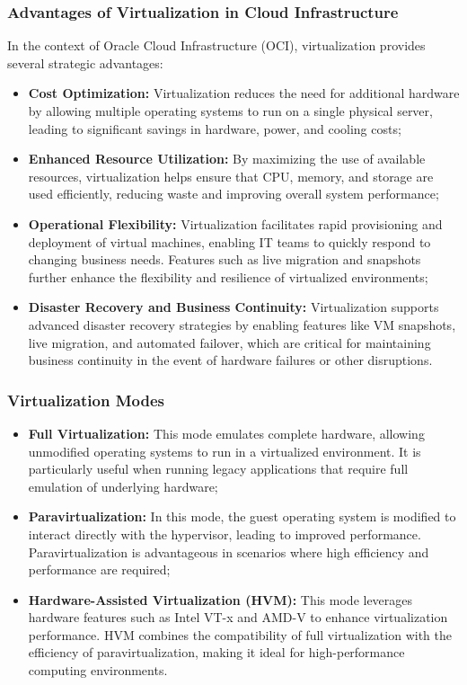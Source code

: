 \subsubsection[Advantages of Virtualization in Cloud Infrastructure]{Advantages of Virtualization in Cloud Infrastructure}
In the context of Oracle Cloud Infrastructure (OCI), virtualization provides several strategic advantages:\mynewline
\begin{itemize}
    \item \textbf{Cost Optimization:} Virtualization reduces the need for additional hardware by allowing multiple operating systems to run on a single physical server, leading to significant savings in hardware, power, and cooling costs;
    \item \textbf{Enhanced Resource Utilization:} By maximizing the use of available resources, virtualization helps ensure that CPU, memory, and storage are used efficiently, reducing waste and improving overall system performance;
    \item \textbf{Operational Flexibility:} Virtualization facilitates rapid provisioning and deployment of virtual machines, enabling IT teams to quickly respond to changing business needs. Features such as live migration and snapshots further enhance the flexibility and resilience of virtualized environments;
    \item \textbf{Disaster Recovery and Business Continuity:} Virtualization supports advanced disaster recovery strategies by enabling features like VM snapshots, live migration, and automated failover, which are critical for maintaining business continuity in the event of hardware failures or other disruptions.
\end{itemize}

\subsubsection[Virtualization Modes]{Virtualization Modes}
\begin{itemize}
    \item \textbf{Full Virtualization:} This mode emulates complete hardware, allowing unmodified operating systems to run in a virtualized environment. It is particularly useful when running legacy applications that require full emulation of underlying hardware;
    \item \textbf{Paravirtualization:} In this mode, the guest operating system is modified to interact directly with the hypervisor, leading to improved performance. Paravirtualization is advantageous in scenarios where high efficiency and performance are required;
    \item \textbf{Hardware-Assisted Virtualization (HVM):} This mode leverages hardware features such as Intel VT-x and AMD-V to enhance virtualization performance. HVM combines the compatibility of full virtualization with the efficiency of paravirtualization, making it ideal for high-performance computing environments.
\end{itemize}



